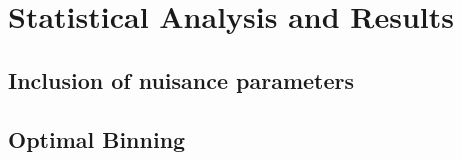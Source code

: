 \chapter{Statistical Analysis and Results}\label{cha:fit}

\section{Inclusion of nuisance parameters}\label{sec:fit:nps}

\section{Optimal Binning}\label{sec:fit:binning}
